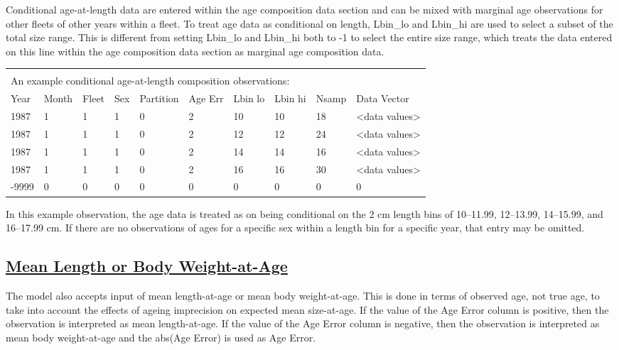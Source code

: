 Conditional age-at-length data are entered within the age composition data section and can be mixed with marginal age observations for other fleets of other years within a fleet. To treat age data as conditional on length, Lbin\_lo and Lbin\_hi are used to select a subset of the total size range. This is different from setting Lbin\_lo and Lbin\_hi both to -1 to select the entire size range, which treats the data entered on this line within the age composition data section as marginal age composition data.  

\vspace*{-\baselineskip}
\begin{tabular}{p{1cm} p{1cm} p{1cm} p{1cm} p{1.5cm} p{1cm} p{1cm} p{1cm} p{1cm} p{2.5cm}}
	\multicolumn{10}{l}{} \\
	\multicolumn{10}{l}{An example conditional age-at-length composition observations:} \\
	\hline
	Year & Month & Fleet & Sex & Partition & Age Err & Lbin lo & Lbin hi & Nsamp & Data Vector \Tstrut\\
	\hline
	1987 & 1 & 1 & 1 & 0 & 2 & 10 & 10 & 18 & <data values> \Tstrut\\
	1987 & 1 & 1 & 1 & 0 & 2 & 12 & 12 & 24 & <data values> \Tstrut\\
	1987 & 1 & 1 & 1 & 0 & 2 & 14 & 14 & 16 & <data values> \Tstrut\\
	1987 & 1 & 1 & 1 & 0 & 2 & 16 & 16 & 30 & <data values> \Tstrut\\
	-9999 & 0 & 0 & 0 & 0 & 0 & 0 & 0 & 0 & 0 \Bstrut\\
	\hline
\end{tabular}

In this example observation, the age data is treated as on being conditional on the 2 cm length bins of 10--11.99, 12--13.99, 14--15.99, and 16--17.99 cm. If there are no observations of ages for a specific sex within a length bin for a specific year, that entry may be omitted.

\hypertarget{MeanLorBWatA}{}
\subsection[Mean Length or Body Weight-at-Age]{\protect\hyperlink{MeanLorBWatA}{Mean Length or Body Weight-at-Age}}
The model also accepts input of mean length-at-age or mean body weight-at-age. This is done in terms of observed age, not true age, to take into account the effects of ageing imprecision on expected mean size-at-age. If the value of the Age Error column is positive, then the observation is interpreted as mean length-at-age. If the value of the Age Error column is negative, then the observation is interpreted as mean body weight-at-age and the abs(Age Error) is used as Age Error.

